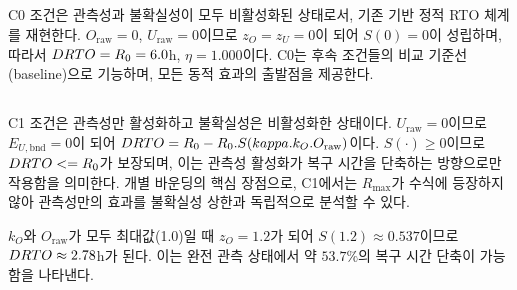 \subsection{}
\label{subsec:c0}

C0 조건은 관측성과 불확실성이 모두 비활성화된 상태로서,
기존  기반 정적 RTO 체계를 재현한다.
$O_{\text{raw}} = 0$, $U_{\text{raw}} = 0$이므로 $z_O = z_U = 0$이 되어
$S(0) = 0$이 성립하며, 따라서 $DRTO = R_0 = 6.0$h, $\eta = 1.000$이다.
C0는 후속 조건들의 비교 기준선(baseline)으로 기능하며,
모든 동적 효과의 출발점을 제공한다.


\subsection{}
\label{subsec:c1}

C1 조건은 관측성만 활성화하고 불확실성은 비활성화한 상태이다.
$U_{\text{raw}} = 0$이므로 $E_{U,\text{bnd}} = 0$이 되어
$DRTO = R_0 - R_0 . S(kappa . k_O . O_{\text{raw}})$이다.
$S(\cdot) \geq 0$이므로 $DRTO <= R_0$가 보장되며,
이는 관측성 활성화가 복구 시간을 단축하는 방향으로만 작용함을 의미한다.
개별 바운딩의 핵심 장점으로, C1에서는 $R_{\max}$가 수식에 등장하지 않아
관측성만의 효과를 불확실성 상한과 독립적으로 분석할 수 있다.

$k_O$와 $O_{\text{raw}}$가 모두 최대값(1.0)일 때
$z_O = 1.2$가 되어
$S(1.2) \approx 0.537$이므로
$DRTO \approx 2.78$h가 된다.
이는 완전 관측 상태에서 약 $53.7\%$의 복구 시간 단축이 가능함을 나타낸다.



\subsection{}
\label{subsec:c2}


